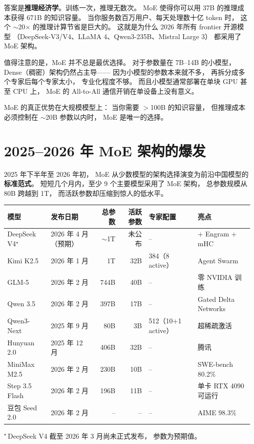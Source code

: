 \begin{whybox}
答案是\textbf{推理经济学}。训练一次，推理无数次。
MoE 使得你可以用 37B 的推理成本获得 671B 的知识容量。
当你服务数百万用户、每天处理数十亿 token 时，
这个 $\sim$20$\times$ 的推理计算节省是巨大的。
这就是为什么 2026 年所有 frontier 开源模型
（DeepSeek-V3/V4、LLaMA 4、Qwen3-235B、Mistral Large 3）
都采用了 MoE 架构。

值得注意的是，MoE 并不总是最优选择。
对于参数量在 7B--14B 的小模型，
Dense（稠密）架构仍然占主导——
因为小模型的参数本来就不多，
再拆分成多个专家后每个专家太小，
专业化程度不够。
而且小模型通常部署在单块 GPU 甚至 CPU 上，
MoE 的 All-to-All 通信开销在单设备上没有意义。

MoE 的真正优势在大规模模型上：
当你需要 $>$100B 的知识容量，
但推理成本必须控制在 $\sim$20B 参数以内时，
MoE 是唯一的选择。
\end{whybox}

\section{2025--2026 年 MoE 架构的爆发}
\label{sec:moe-explosion}

2025 年下半年至 2026 年初，
MoE 从少数模型的架构选择演变为前沿中国模型的\textbf{标准范式}。
短短几个月内，至少 9 个主要模型采用了 MoE 架构，
总参数规模从 80B 跨越到 1T，
而活跃参数却压缩到惊人的低水平。

\begin{center}
\begin{tabular}{llrrll}
  \hline
  \textbf{模型} & \textbf{发布日期} & \textbf{总参数} & \textbf{活跃参数}
  & \textbf{专家配置} & \textbf{亮点} \\
  \hline
  DeepSeek V4$^\star$ & 2026 年 4 月（预期） & $\sim$1T & 未公布
  & -- & + Engram + mHC \\
  Kimi K2.5 & 2026 年 1 月 & 1T & 32B
  & 384（8 active） & Agent Swarm \\
  GLM-5 & 2026 年 2 月 & 744B & 40B
  & -- & 零 NVIDIA 训练 \\
  Qwen 3.5 & 2026 年 2 月 & 397B & 17B
  & -- & Gated Delta Networks \\
  Qwen3-Next & 2025 年 9 月 & 80B & 3B
  & 512（10+1 active） & 超稀疏激活 \\
  Hunyuan 2.0 & 2025 年 12 月 & 406B & 32B
  & -- & 腾讯 \\
  MiniMax M2.5 & 2026 年 2 月 & 230B & 10B
  & -- & SWE-bench 80.2\% \\
  Step 3.5 Flash & 2026 年 2 月 & 196B & 11B
  & -- & 单卡 RTX 4090 可运行 \\
  豆包 Seed 2.0 & 2026 年 2 月 & -- & --
  & -- & AIME 98.3\% \\
  \hline
\end{tabular}

\small $^\star$\,DeepSeek V4 截至 2026 年 3 月尚未正式发布，
参数为预期值。
\end{center}

